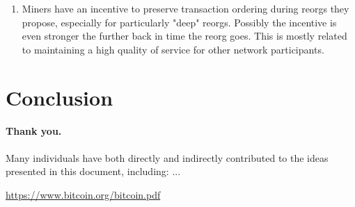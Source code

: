 \documentclass[letterpaper]{article}
\begin{document}
\begin{enumerate}
\item Miners have an incentive to preserve transaction ordering during reorgs
they propose, especially for particularly "deep" reorgs. Possibly the incentive
is even stronger the further back in time the reorg goes. This is mostly
related to maintaining a high quality of service for other network
participants.

\end{enumerate}

\section{Conclusion}

\paragraph{Thank you.} Many individuals have both directly and indirectly
contributed to the ideas presented in this document, including: ...

\begin{thebibliography}{9}
 \url{https://www.bitcoin.org/bitcoin.pdf}
\end{thebibliography}
\end{document}
